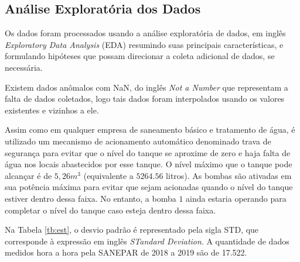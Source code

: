 
\subsection{An\'alise Explorat\'oria dos Dados}

Os dados foram processados usando a  análise exploratória de dados, em inglês \textit{Exploratory Data Analysis} (EDA)  \cite{Bandara2021} resumindo suas principais características, e formulando hipóteses que possam direcionar a coleta adicional de dados, se necessária. 

Existem dados anômalos com NaN, do inglês \textit{Not a Number} que representam a falta de dados coletados, logo tais dados foram interpolados usando os valores existentes e vizinhos a ele. 

Assim como em qualquer empresa de saneamento básico e tratamento de água, é utilizado um mecanismo de acionamento automático denominado trava de segurança para evitar que o nível do tanque se aproxime de zero e haja falta de água nos locais abastecidos por esse tanque. O nível máximo que o tanque pode alcançar é de $5,26 m^3$ (equivalente a $5264.56$ litros). As bombas são ativadas em sua potência máxima para evitar que sejam acionadas quando o nível do tanque estiver dentro dessa faixa. No entanto, a bomba $1$ ainda estaria operando para completar o nível do tanque caso esteja dentro dessa faixa. 

Na Tabela \ref{tb:est}, o desvio padrão é representado pela sigla STD, que corresponde à expressão em inglês \textit{STandard Deviation}. A quantidade de dados medidos hora a hora pela SANEPAR de 2018 a 2019 são de 17.522.

